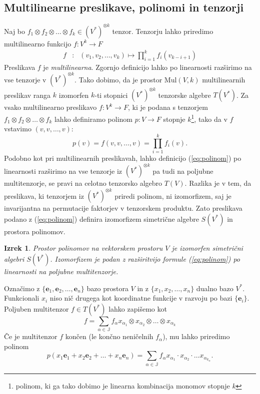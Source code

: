 \documentclass{article}
\newcommand{\JJ}{\mathbb{J}}
\newcommand{\e}{\mathbf{e}}
\newtheorem{izrek}{Izrek}[section]
\begin{document}
\subsection{Multilinearne preslikave, polinomi in tenzorji}
Naj bo $f_1\otimes f_2\otimes \ldots \otimes f_k\in (V^*)^{\otimes k}$
tenzor. Tenzorju lahko priredimo multilinearno funkcijo $f:V^k\to F$ 
\begin{eqnarray}
  \label{eq:multilinear}
f&:&(v_1,v_2,\ldots,v_k) \mapsto \prod_{i=1}^k f_i(v_{k-i+1}) 
\end{eqnarray}
Preslikava $f$ je \emph{multilinearna}. Zgornjo definicijo lahko po linearnosti
razširimo na vse tenzorje v $(V^*)^{\otimes k}$. Tako dobimo, da je prostor
$\mathrm{Mul}(V,k)$ multilinearnih preslikav ranga $k$ izomorfen $k$-ti stopnici
$(V^*)^{\otimes k}$ tenzorske algebre $T(V^*)$. 
Za vsako multilinearno preslikavo $f:V^k\to F$, ki je podana s tenzorjem
$f_1\otimes f_2\otimes\ldots \otimes f_k$ lahko definiramo polinom $p:V\to
F$ stopnje $k$\footnote{polinom, ki ga tako dobimo je linearna kombinacija monomov stopnje $k$}, tako da v $f$ vstavimo $(v,v,\ldots, v)$:
\begin{equation}
  \label{eq:polinom}
  p(v) = f(v,v,\ldots, v) = \prod_{i=1}^kf_i(v).
\end{equation}
Podobno kot pri multilinearnih preslikavah, lahko definicijo (\ref{eq:polinom})
po linearnosti razširimo na vse tenzorje iz $(V^*)^{\otimes k}$ pa tudi na
poljubne multitenzorje, se pravi na celotno tenzorsko algebro $T(V)$. Razlika je v
tem, da preslikava, ki tenzorjem iz $(V^*)^{\otimes k}$ priredi polinom, ni
izomorfizem, saj je invarijantna na permutacije faktorjev v tenzorskem
produktu. Zato preslikava podano z (\ref{eq:polinom}) definira izomorfizem
simetrične algebre $S(V^*)$ in prostora polinomov.
\begin{izrek}
  Prostor polinomov na vektorskem prostoru $V$ je izomorfen simetrični algebri
  $S(V^*)$. Izomorfizem je podan z razširitvijo formule (\ref{eq:polinom}) po
  linearnosti na poljubne multitenzorje.
\end{izrek}
Označimo z $\{\e_1,\e_2,\ldots,\e_n\}$ bazo prostora $V$ in z $\{x_1,x_2,\ldots,
x_n\}$ dualno bazo $V^*$. Funkcionali $x_i$ niso nič drugega kot koordinatne
funkcije v razvoju po bazi $\{\e_i\}$. Poljuben multitenzor $f\in T(V^*)$ lahko
zapišemo kot 
$$f = \sum_{\alpha \in \JJ}f_\alpha x_{\alpha_1}\otimes
x_{\alpha_2}\otimes\ldots \otimes x_{\alpha_k}$$
Če je multitenzor $f$ končen (le končno neničelnih $f_\alpha$),  mu lahko
priredimo polinom 
$$p(x_1\e_1+x_2\e_2+\ldots +x_n\e_n)=\sum_{\alpha \in \JJ}f_\alpha x_{\alpha_1}\cdot
x_{\alpha_2}\cdot\ldots  x_{\alpha_{k_\alpha}}.$$
 
\end{document}
